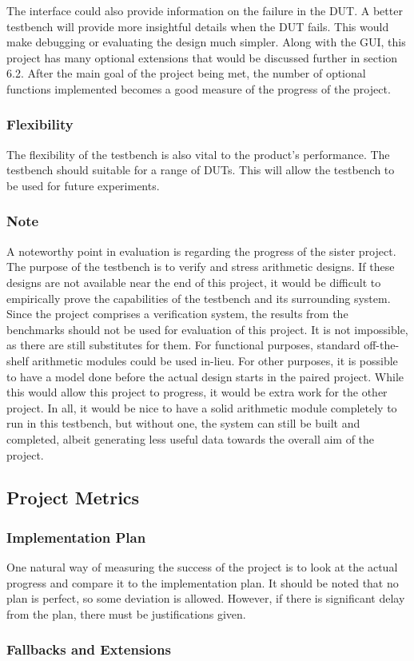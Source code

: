 The interface could also provide information on the failure in the DUT.
A better testbench will provide more insightful details when the DUT fails.
This would make debugging or evaluating the design much simpler.
Along with the GUI, this project has many optional extensions that would be
discussed further in section 6.2.
After the main goal of the project being met, the number of optional functions
implemented becomes a good measure of the progress of the project.

\subsubsection{\textbf{Flexibility}}
The flexibility of the testbench is also vital to the product's performance.
The testbench should suitable for a range of DUTs.
This will allow the testbench to be used for future experiments.

\subsubsection{\textbf{Note}}
A noteworthy point in evaluation is regarding the progress of the sister project.
The purpose of the testbench is to verify and stress arithmetic designs.
If these designs are not available near the end of this project,
it would be difficult to empirically prove the capabilities of the testbench
and its surrounding system.
Since the project comprises a verification system, the results from the
benchmarks should not be used for evaluation of this project.
It is not impossible, as there are still substitutes for them.
For functional purposes, standard off-the-shelf arithmetic modules could be
used in-lieu.
For other purposes, it is possible to have a model done before the actual design
starts in the paired project.
While this would allow this project to progress, it would be extra work
for the other project.
In all, it would be nice to have a solid arithmetic module completely to run
in this testbench, but without one, the system can still be built and completed,
albeit generating less useful data towards the overall aim of the project.

\subsection{Project Metrics}
\subsubsection{\textbf{Implementation Plan}}
One natural way of measuring the success of the project is to look at the actual
progress and compare it to the implementation plan.
It should be noted that no plan is perfect, so some deviation is allowed.
However, if there is significant delay from the plan, there must be
justifications given.

\subsubsection{\textbf{Fallbacks and Extensions}}